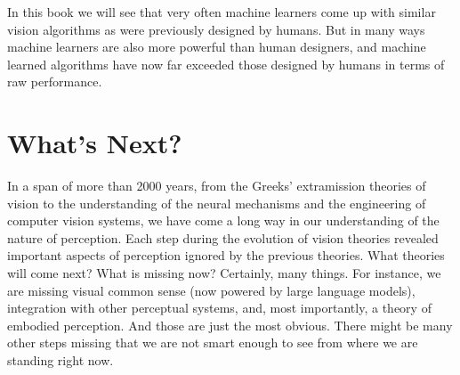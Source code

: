 

In this book we will see that very often machine learners come up with similar vision algorithms as were previously designed by humans. But in many ways machine learners are also more powerful than human designers, and machine learned algorithms have now far exceeded those designed by humans in terms of raw performance.















 
\section{What's Next?}


In a span of more than 2000 years, from the Greeks' extramission theories of vision to the understanding of the neural mechanisms and the engineering of computer vision systems, we have come a long way in our understanding of the nature of perception. 
Each step during the evolution of vision theories revealed important aspects of perception ignored by the previous theories. What theories will come next? What is missing now? Certainly, many things. For instance, we are missing visual common sense (now powered by large language models), integration with other perceptual systems, and, most importantly, a theory of embodied perception. And those are just the most obvious. There might be many other steps missing that we are not smart enough to see from where we are standing right now. 



